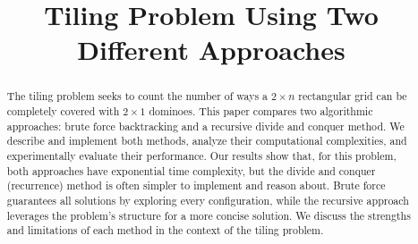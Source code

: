 \documentclass[conference]{IEEEtran}
\begin{document}
\title{Tiling Problem Using Two Different Approaches\\
}

\author{
\and
{}
\and
{}
\and
{}
\and
{}
\and
{}
}

\maketitle

\begin{abstract}
The tiling problem seeks to count the number of ways a $2 \times n$ rectangular grid can be completely covered with $2 \times 1$ dominoes. This paper compares two algorithmic approaches: brute force backtracking and a recursive divide and conquer method. We describe and implement both methods, analyze their computational complexities, and experimentally evaluate their performance. Our results show that, for this problem, both approaches have exponential time complexity, but the divide and conquer (recurrence) method is often simpler to implement and reason about. Brute force guarantees all solutions by exploring every configuration, while the recursive approach leverages the problem's structure for a more concise solution. We discuss the strengths and limitations of each method in the context of the tiling problem.
\end{abstract}
\end{document}
